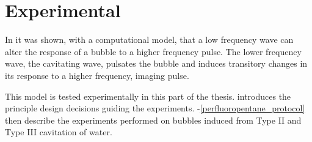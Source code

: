 
\part{Experimental}\label{part:experimental}

\begin{quote}

\end{quote}



In  it was shown, with a computational model,
that a low frequency wave can alter the response of a bubble to a higher frequency pulse.
The lower frequency wave, the cavitating wave,
pulsates the bubble and induces transitory changes in its response to a higher frequency, imaging pulse.

This model is tested experimentally in this part of the thesis.
 introduces the principle design decisions guiding the experiments.
-\ref{perfluoropentane_protocol}
then describe the experiments performed on %
bubbles induced from Type II and Type III  cavitation of water.


